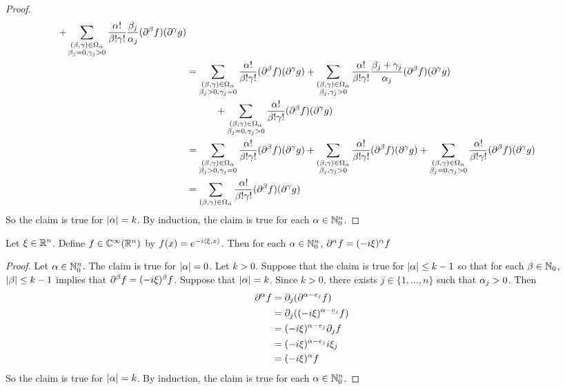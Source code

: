 \documentclass{book}
\begin{document}
\begin{proof}
\begin{align*}
			+ \sum_{\substack{(\beta, \gamma) \in \Omega_{\alpha} \\ \beta_j = 0, \gamma_j > 0}} \frac{\alpha!}{\beta !\gamma !} \frac{\beta_j}{\alpha_j}(\partial^{\beta} f) (\partial^{\gamma}g)\\ 
			& = \sum_{\substack{(\beta, \gamma) \in \Omega_{\alpha} \\ \beta_j > 0, \gamma_j = 0}} \frac{\alpha!}{\beta !\gamma !} (\partial^{\beta} f) (\partial^{\gamma}g) 
			+ \sum_{\substack{(\beta, \gamma) \in \Omega_{\alpha} \\ \beta_j, \gamma_j > 0}} \frac{\alpha!}{\beta !\gamma !} \frac{\beta_j + \gamma_j}{\alpha_j}(\partial^{\beta} f) (\partial^{\gamma}g) \\
			& \quad \quad \quad + \sum_{\substack{(\beta, \gamma) \in \Omega_{\alpha} \\ \beta_j = 0, \gamma_j > 0}} \frac{\alpha!}{\beta !\gamma !} (\partial^{\beta} f) (\partial^{\gamma}g)\\ 
			& = \sum_{\substack{(\beta, \gamma) \in \Omega_{\alpha} \\ \beta_j > 0, \gamma_j = 0}} \frac{\alpha!}{\beta !\gamma !} (\partial^{\beta} f) (\partial^{\gamma}g) 
			+ \sum_{\substack{(\beta, \gamma) \in \Omega_{\alpha} \\ \beta_j, \gamma_j > 0}} \frac{\alpha!}{\beta !\gamma !} (\partial^{\beta} f) (\partial^{\gamma}g) +  \sum_{\substack{(\beta, \gamma) \in \Omega_{\alpha} \\ \beta_j = 0, \gamma_j > 0}} \frac{\alpha!}{\beta !\gamma !} (\partial^{\beta} f) (\partial^{\gamma}g)\\ 
			& = \sum_{(\beta, \gamma) \in \Omega_{\alpha}} \frac{\alpha!}{\beta !\gamma !} (\partial^{\beta} f) (\partial^{\gamma}g) 
		\end{align*}
		So the claim is true for $|\alpha| = k$. By induction, the claim is true for each $\alpha \in \mathbb{N}_0^n$.
	\end{proof}

	\begin{ex}
		Let $\xi \in \mathbb{R}^n$. Define $f \in \mathbb{C}^{\infty}(\mathbb{R}^n)$ by $f(x) = e^{-i \langle \xi , x \rangle}$. Then for each $\alpha \in \mathbb{N}_{0}^n$, $\partial^{\alpha} f = (-i \xi)^{\alpha} f$
	\end{ex}

	\begin{proof}
		Let $\alpha \in \mathbb{N}_0^n$. The claim is true for $|\alpha| = 0$. Let $k > 0$. Suppose that the claim is true for $|\alpha| \leq k-1$ so that for each $\beta \in \mathbb{N}_0$, $|\beta| \leq k-1$ implies that $\partial^{\beta} f = (-i\xi)^{\beta} f$. Suppose that $|\alpha| = k$. Since $k > 0$, there exists $j \in \{1, \ldots, n\}$ such that $\alpha_j >0$. Then
		\begin{align*}
			\partial^{\alpha} f
			& = \partial_j (\partial^{\alpha - e_j} f) \\
			& = \partial_j( (-i \xi)^{\alpha - e_j} f) \\
			& = (-i \xi)^{\alpha - e_j} \partial_j f \\
			& = (-i \xi)^{\alpha - e_j} i \xi_j \\
			& = (-i \xi)^{\alpha} f
		\end{align*}  
		So the claim is true for $|\alpha| = k$. By induction, the claim is true for each $\alpha \in \mathbb{N}_0^n$.
		
	\end{proof}
	
\end{document}
